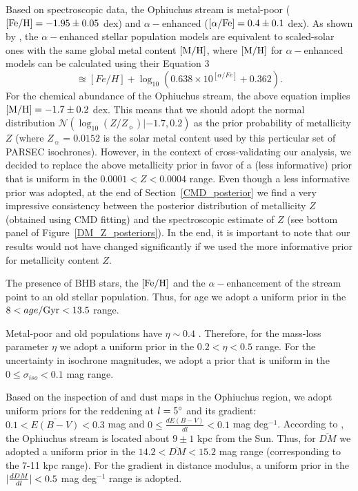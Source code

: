 \documentclass[iop]{emulateapj}
\begin{document}
Based on spectroscopic data, the Ophiuchus stream is metal-poor
(${\rm [Fe/H]=-1.95\pm0.05}$ dex) and $\alpha-$enhanced
(${\rm [\alpha/Fe]=0.4\pm0.1}$ dex). As shown by \citet{scs93}, the
$\alpha-$enhanced stellar population models are equivalent to scaled-solar ones 
with the same global metal content ${\rm [M/H]}$, where ${\rm [M/H]}$ for
$\alpha-$enhanced models can be calculated using their Equation 3
\begin{equation}
    [M/H]\approxeq [Fe/H] + \log_{10}(0.638\times10^{[\alpha/Fe]} + 0.362).
\end{equation}
For the chemical abundance of the Ophiuchus stream, the above equation implies
${\rm [M/H]}=-1.7\pm0.2$ dex. This means that we should adopt the normal
distribution $\mathcal{N}(\log_{10}(Z/Z_\sun)| -1.7, 0.2)$ as the prior
probability of metallicity $Z$ (where $Z_\sun=0.0152$ is the solar metal content
used by this perticular set of PARSEC isochrones). However, in the context of
cross-validating our analysis, we decided to replace the above metallicity prior
in favor of a (less informative) prior that is uniform in the
$0.0001 < Z < 0.0004$ range. Even though a less informative prior was adopted,
at the end of Section~\ref{CMD_posterior} we find a very impressive consistency
between the posterior distribution of metallicity $Z$ (obtained using CMD
fitting) and the spectroscopic estimate of $Z$ (see bottom panel of
Figure~\ref{DM_Z_posteriors}). In the end, it is important to note that our
results would not have changed significantly if we used the more informative
prior for metallicity content $Z$.

The presence of BHB stars, the ${\rm [Fe/H]}$ and the $\alpha-$enhancement of
the stream point to an old stellar population. Thus, for age we adopt a uniform
prior in the $8 < age/{\rm Gyr} < 13.5$ range.

Metal-poor and old populations have $\eta\sim0.4$ \citep{rpf88}. Therefore, for
the mass-loss parameter $\eta$ we adopt a uniform prior in the $0.2<\eta<0.5$
range. For the uncertainty in isochrone magnitudes, we adopt a prior that is
uniform in the $0 \leq \sigma_{iso} < 0.1$ mag range.

Based on the inspection of \citet{SFD98} and \citet{sch14} dust maps in the
Ophiuchus region, we adopt uniform priors for the reddening at $l=5\mbox{$^\circ$}$ and 
its gradient: $0.1 < \overline{E(B-V)} < 0.3$ mag and
$0 \leq \frac{dE(B-V)}{dl} < 0.1$ mag deg$^{-1}$. According to \citet{ber14b},
the Ophiuchus stream is located about $9\pm1$ kpc from the Sun. Thus, for
$\overline{DM}$ we adopted a uniform prior in the $14.2 < \overline{DM} < 15.2$ 
mag range (corresponding to the 7-11 kpc range). For the gradient in distance
modulus, a uniform prior in the
$\arrowvert\frac{dDM}{dl}\arrowvert < 0.5$ mag deg$^{-1}$ range is adopted.
\end{document}
